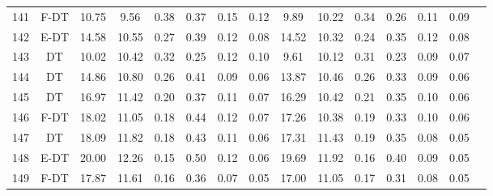 \begin{longtable}{@{\hskip3pt}c@{\hskip3pt}c@{\hskip3pt}c@{\hskip3pt}c@{\hskip3pt}c@{\hskip3pt}c@{\hskip3pt}c@{\hskip3pt}c@{\hskip3pt}c@{\hskip3pt}c@{\hskip3pt}c@{\hskip3pt}c@{\hskip3pt}c@{\hskip3pt}c@{\hskip3pt}c}
        141 &           F-DT &             10.75 &        9.56 &          0.38 &        0.37 &        0.15 &         0.12 &                9.89 &       10.22 &          0.34 &        0.26 &        0.11 &         0.09 \\
        142 &           E-DT &             14.58 &       10.55 &          0.27 &        0.39 &        0.12 &         0.08 &               14.52 &       10.32 &          0.24 &        0.35 &        0.12 &         0.08 \\
        143 &             DT &             10.02 &       10.42 &          0.32 &        0.25 &        0.12 &         0.10 &                9.61 &       10.12 &          0.31 &        0.23 &        0.09 &         0.07 \\
        144 &             DT &             14.86 &       10.80 &          0.26 &        0.41 &        0.09 &         0.06 &               13.87 &       10.46 &          0.26 &        0.33 &        0.09 &         0.06 \\
        145 &             DT &             16.97 &       11.42 &          0.20 &        0.37 &        0.11 &         0.07 &               16.29 &       10.42 &          0.21 &        0.35 &        0.10 &         0.06 \\
        146 &           F-DT &             18.02 &       11.05 &          0.18 &        0.44 &        0.12 &         0.07 &               17.26 &       10.38 &          0.19 &        0.33 &        0.10 &         0.06 \\
        147 &             DT &             18.09 &       11.82 &          0.18 &        0.43 &        0.11 &         0.06 &               17.31 &       11.43 &          0.19 &        0.35 &        0.08 &         0.05 \\
        148 &           E-DT &             20.00 &       12.26 &          0.15 &        0.50 &        0.12 &         0.06 &               19.69 &       11.92 &          0.16 &        0.40 &        0.09 &         0.05 \\
        149 &           F-DT &             17.87 &       11.61 &          0.16 &        0.36 &        0.07 &         0.05 &               17.00 &       11.05 &          0.17 &        0.31 &        0.08 &         0.05 \\
\end{longtable}
